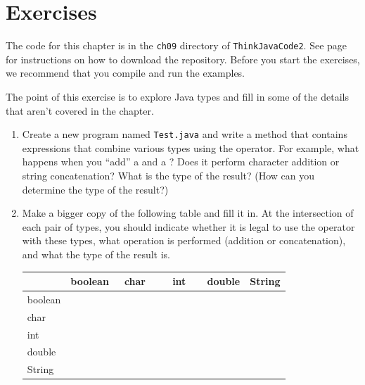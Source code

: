 \section{Exercises}

The code for this chapter is in the {\tt ch09} directory of {\tt ThinkJavaCode2}.
See page~\pageref{code} for instructions on how to download the repository.
Before you start the exercises, we recommend that you compile and run the examples.


\begin{exercise}  %

The point of this exercise is to explore Java types and fill in some of the details that aren't covered in the chapter.


\begin{enumerate}

\item Create a new program named {\tt Test.java} and write a  method that contains expressions that combine various types using the \java{+} operator.
For example, what happens when you ``add'' a  and a ?
Does it perform character addition or string concatenation?
What is the type of the result?
(How can you determine the type of the result?)

\item Make a bigger copy of the following table and fill it in.
At the intersection of each pair of types, you should indicate whether it is legal to use the \java{+} operator with these types, what operation is performed (addition or concatenation), and what the type of the result is.

\begin{center}
\begin{tabular}{|l|l|l|l|l|l|} \hline
        &  boolean  &  ~char~  &  ~~int~~  &  double  &  String \\ \hline
boolean &           &          &           &          &         \\ \hline
char    &           &          &           &          &         \\ \hline
int     &           &          &           &          &         \\ \hline
double  &           &          &           &          &         \\ \hline
String  &           &          &           &          &         \\ \hline
\end{tabular}
\end{center}


\end{enumerate}
\end{exercise}
